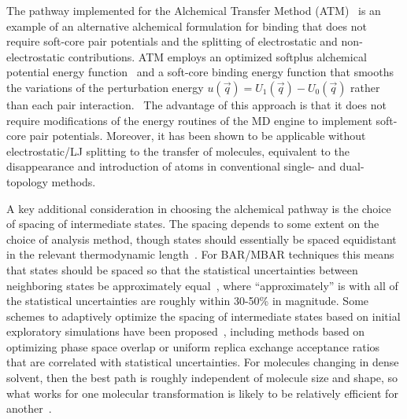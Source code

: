 \documentclass[9pt,bestpractices]{livecoms}
\begin{document}
The pathway implemented for the Alchemical Transfer Method (ATM)~\cite{pal2019perturbation,khuttan2021alchemical,wu2021alchemical,azimi2022relative} is an example of an alternative alchemical formulation for binding that does not require soft-core pair potentials and the splitting of electrostatic and non-electrostatic contributions. ATM employs an optimized softplus alchemical potential energy function~\cite{pal2019perturbation} and a soft-core binding energy function that smooths the variations of the perturbation energy $u(\vec{q}) = U_1(\vec{q}) - U_0(\vec{q})$ rather than each pair interaction.~\cite{khuttan2021alchemical} The advantage of this approach is that it does not require modifications of the energy routines of the MD engine to implement soft-core pair potentials. Moreover, it has been shown to be applicable without electrostatic/LJ splitting to the transfer of molecules, equivalent to the disappearance and introduction of atoms in conventional single- and dual-topology methods.~\cite{khuttan2021alchemical}

A key additional consideration in choosing the alchemical pathway is the choice of spacing of intermediate states.
The spacing depends to some extent on the choice of analysis method, though states should essentially be spaced equidistant in the relevant thermodynamic length~\cite{crooks2007measuring, sivak2012thermodynamic}.
For BAR/MBAR techniques this means that states should be spaced so that the statistical uncertainties between neighboring states be approximately equal~\cite{pham2012optimal, shenfeld2009minimizing}, where ``approximately'' is with all of the statistical uncertainties are roughly within 30-50\% in magnitude. 
Some schemes to adaptively optimize the spacing of intermediate states based on initial exploratory simulations have been proposed~\cite{hayes2017adaptive,zhang_jchemtheorycomput_2024_v20_p3935}, including methods based on optimizing phase space overlap or uniform replica exchange acceptance ratios~\cite{zhang_jchemtheorycomput_2024_v20_p3935} that are correlated with statistical uncertainties. For molecules changing in dense solvent, then the best path is roughly independent of molecule size and shape, so what works for one molecular transformation is likely to be relatively efficient for another~\cite{monroe2014converging}.
\end{document}
